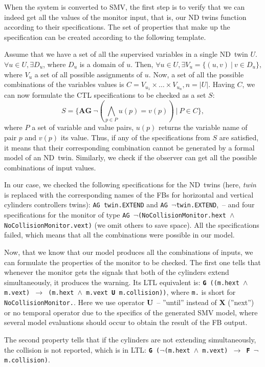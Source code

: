 \documentclass[conference]{IEEEtran}
\begin{document}
When the system is converted to SMV, the first step is to verify that we can indeed get all the values of the monitor input, that is, our ND twins function according to their specifications. The set of properties that make up the specification can be created according to the following template. 

Assume that we have a set of all the supervised variables in a single ND~twin $U$.
$\forall u \in U, \exists D_u$, where $D_u$ is a domain of $u$. Then, $\forall u \in U, \exists V_u = \{(u,v) \:|\: v \in D_u\}$, where $V_u$ a set of all possible assignments of $u$. Now, a set of all the possible combinations of the variables values is $C = V_{u_1}\times\ldots\times V_{u_n}, n = |U|$. Having $C$, we can now formulate the CTL specifications to be checked as a set $S$:
$$S = \{\textbf{AG} \:\neg(\bigwedge_{p \in P} u(p) = v(p)) \:|\: P \in C\},$$
where $P$ a set of variable and value pairs, $u(p)$ returns the variable name of pair $p$ and $v(p)$ its value. Thus, if any of the specifications from $S$ are satisfied, it means that their corresponding combination cannot be generated by a formal model of an ND~twin.
Similarly, we check if the observer can get all the possible combinations of input values.

In our case, we checked the following specifications for the ND~twins (here, \emph{twin} is replaced with the corresponding names of the FBs for horizontal and vertical cylinders controllers twins): \texttt{AG twin.EXTEND} and \texttt{AG $\neg$twin.EXTEND},~-- and four specifications for the monitor of type \texttt{AG $\neg$(NoCollisionMonitor.hext $\land$ NoCollisionMonitor.vext)} (we omit others to save space). All the specifications failed, which means that all the combinations were possible in our model. 

Now, that we know that our model produces all the combinations of inputs, we can formulate the properties of the monitor to be checked. The first one tells that whenever the monitor gets the signals that both of the cylinders extend simultaneously, it produces the warning. Its LTL equivalent is: \texttt{\textbf{G} ((m.hext $\land$ m.vext) $\rightarrow$ (m.hext $\land$ m.vext \textbf{U} m.collision))}, where \texttt{m.} is short for \texttt{NoCollisionMonitor.}. Here we use operator \textbf{U}~-- ''until'' instead of \textbf{X} (''next'') or no temporal operator due to the specifics of the generated SMV model, where several model evaluations should occur to obtain the result of the FB output.

The second property tells that if the cylinders are not extending simultaneously, the collision is not reported, which is in LTL: \texttt{\textbf{G} ($\neg$(m.hext $\land$ m.vext) $\rightarrow$ \textbf{F} $\neg$ m.collision)}.
\end{document}
